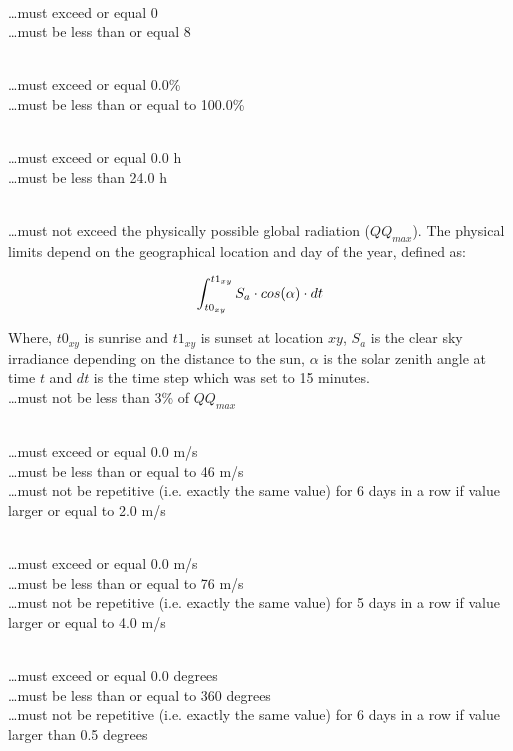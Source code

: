 \documentclass[a4paper,11pt]{article}
\begin{document}
\\
\ldots must exceed or equal 0\\
\ldots must be less than or equal 8
\medskip

\\
\ldots must exceed or equal 0.0\%\\
\ldots must be less than or equal to 100.0\%
\medskip

\\
\ldots must exceed or equal 0.0 h\\
\ldots must be less than 24.0 h
\medskip

\\
\ldots must not exceed the physically possible global radiation ($QQ_{max}$). The physical limits depend on the geographical location and day of the year, defined as:

\begin{equation}
     \int_{t0_{xy}}^{t1_{xy}}S_{a} \cdot cos(\alpha) \cdot dt \notag
\end{equation}

Where, $t0_{xy}$ is sunrise and $t1_{xy}$ is sunset at location $xy$, $S_{a}$ is the clear sky irradiance depending on the distance to the sun, $\alpha$ is the solar zenith angle at time $t$ and $dt$ is the time step which was set to 15 minutes.\\ 
\ldots must not be less than 3\% of $QQ_{max}$
\medskip

\\
\ldots must exceed or equal 0.0 m/s\\
\ldots must be less than or equal to 46 m/s\\
\ldots must not be repetitive (i.e. exactly the same value) for 6
days in a row if value larger or equal to 2.0 m/s
\medskip

\\
\ldots must exceed or equal 0.0 m/s\\
\ldots must be less than or equal to 76 m/s\\
\ldots must not be repetitive (i.e. exactly the same value) for 5
days in a row if value larger or equal to 4.0 m/s
\medskip

\\
\ldots must exceed or equal 0.0 degrees\\
\ldots must be less than or equal to 360 degrees\\
\ldots must not be repetitive (i.e. exactly the same value) for 6 days
in a row if value larger than 0.5 degrees
\medskip
\end{document}
